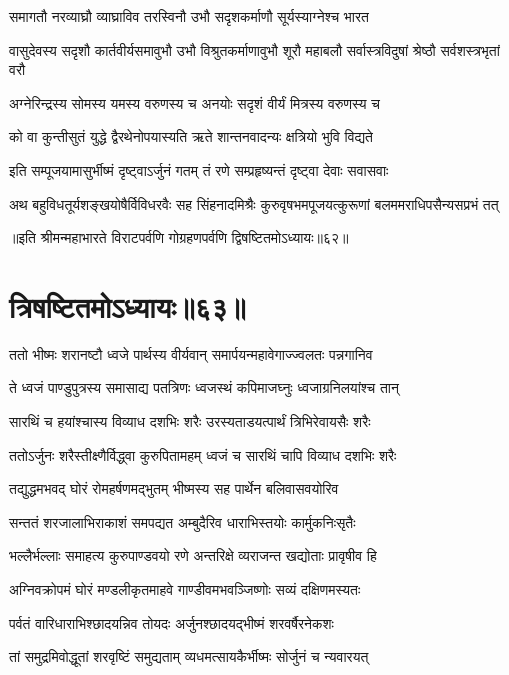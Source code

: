 \twolineshloka
{समागतौ नरव्याघ्रौ व्याघ्राविव तरस्विनौ}
{उभौ सदृशकर्माणौ सूर्यस्याग्नेश्च भारत}


\threelineshloka
{वासुदेवस्य सदृशौ कार्तवीर्यसमावुभौ}
{उभौ विश्रुतकर्माणावुभौ शूरौ महाबलौ}
{सर्वास्त्रविदुषां श्रेष्ठौ सर्वशस्त्रभृतां वरौ}


\twolineshloka
{अग्नेरिन्द्रस्य सोमस्य यमस्य वरुणस्य च}
{अनयोः सदृशं वीर्यं मित्रस्य वरुणस्य च}


\twolineshloka
{को वा कुन्तीसुतं युद्धे द्वैरथेनोपयास्यति}
{ऋते शान्तनवादन्यः क्षत्रियो भुवि विद्यते}


\twolineshloka
{इति सम्पूजयामासुर्भीष्मं दृष्ट्वाऽर्जुनं गतम्}
{तं रणे सम्प्रहृष्यन्तं दृष्ट्वा देवाः सवासवाः}


\twolineshloka
{अथ बहुविधतूर्यशङ्खयोषैर्विविधरवैः सह सिंहनादमिश्रैः}
{कुरुवृषभमपूजयत्कुरूणां बलममराधिपसैन्यसप्रभं तत्}

॥इति श्रीमन्महाभारते विराटपर्वणि गोग्रहणपर्वणि द्विषष्टितमोऽध्यायः॥६२॥

\chapter{त्रिषष्टितमोऽध्यायः॥६३॥}

\twolineshloka
{ततो भीष्मः शरानष्टौ ध्वजे पार्थस्य वीर्यवान्}
{समार्पयन्महावेगाज्ज्वलतः पन्नगानिव}


\twolineshloka
{ते ध्वजं पाण्डुपुत्रस्य समासाद्य पतत्रिणः}
{ध्वजस्थं कपिमाजघ्नुः ध्वजाग्रनिलयांश्च तान्}


\twolineshloka
{सारथिं च हयांश्चास्य विव्याध दशभिः शरैः}
{उरस्यताडयत्पार्थं त्रिभिरेवायसैः शरैः}


\twolineshloka
{ततोऽर्जुनः शरैस्तीक्ष्णैर्विद्ध्वा कुरुपितामहम्}
{ध्वजं च सारथिं चापि विव्याध दशभिः शरैः}


\twolineshloka
{तद्युद्धमभवद् घोरं रोमहर्षणमद्भुतम्}
{भीष्मस्य सह पार्थेन बलिवासवयोरिव}


\twolineshloka
{सन्ततं शरजालाभिराकाशं समपद्यत}
{अम्बुदैरिव धाराभिस्तयोः कार्मुकनिःसृतैः}


\twolineshloka
{भल्लैर्भल्लाः समाहत्य कुरुपाण्डवयो रणे}
{अन्तरिक्षे व्यराजन्त खद्योताः प्रावृषीव हि}


\twolineshloka
{अग्निवक्रोपमं घोरं मण्डलीकृतमाहवे}
{गाण्डीवमभवञ्जिष्णोः सव्यं दक्षिणमस्यतः}


\twolineshloka
{पर्वतं वारिधाराभिश्छादयन्निव तोयदः}
{अर्जुनश्छादयद्भीष्मं शरवर्षैरनेकशः}


\twolineshloka
{तां समुद्रमिवोद्धूतां शरवृष्टिं समुद्यताम्}
{व्यधमत्सायकैर्भीष्मः सोर्जुनं च न्यवारयत्}


